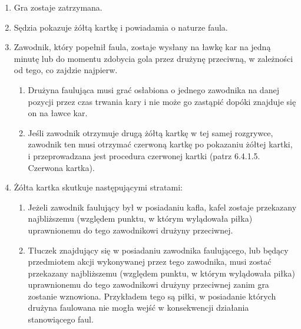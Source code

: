 \documentclass[12pt]{article}
\begin{document}
\begin{enumerate}
\item
    Gra zostaje zatrzymana.
  \item
    Sędzia pokazuje żółtą kartkę i powiadamia o naturze faula.
  \item
    Zawodnik, który popełnił faula, zostaje wysłany na ławkę kar na jedną
  minutę lub do momentu zdobycia gola przez drużynę przeciwną, w
  zależności od tego, co zajdzie najpierw.
  
  \begin{enumerate}
  \item
        Drużyna faulująca musi grać osłabiona o jednego zawodnika na danej
    pozycji przez czas trwania kary i nie może go zastąpić dopóki
    znajduje się on na ławce kar.
      \item
        Jeśli zawodnik otrzymuje drugą żółtą kartkę w tej samej rozgrywce,
    zawodnik ten musi otrzymać czerwoną kartkę po pokazaniu żółtej
    kartki, i przeprowadzana jest procedura czerwonej kartki (patrz
    6.4.1.5. Czerwona kartka).
      \end{enumerate}
\item
    Żółta kartka skutkuje następującymi stratami:
  
  \begin{enumerate}
  \item
        Jeżeli zawodnik faulujący był w posiadaniu kafla, kafel zostaje
    przekazany najbliższemu (względem punktu, w którym wylądowała piłka)
    uprawnionemu do tego zawodnikowi drużyny przeciwnej.
      \item
        Tłuczek znajdujący się w posiadaniu zawodnika faulującego, lub
    będący przedmiotem akcji wykonywanej przez tego zawodnika, musi
    zostać przekazany najbliższemu (względem punktu, w którym wylądowała
    piłka) uprawnionemu do tego zawodnikowi drużyny przeciwnej zanim gra
    zostanie wznowiona. Przykładem tego są piłki, w posiadanie których
    drużyna faulowana nie mogła wejść w konsekwencji działania
    stanowiącego faul.
    

\end{enumerate}
\end{enumerate}
\end{document}
